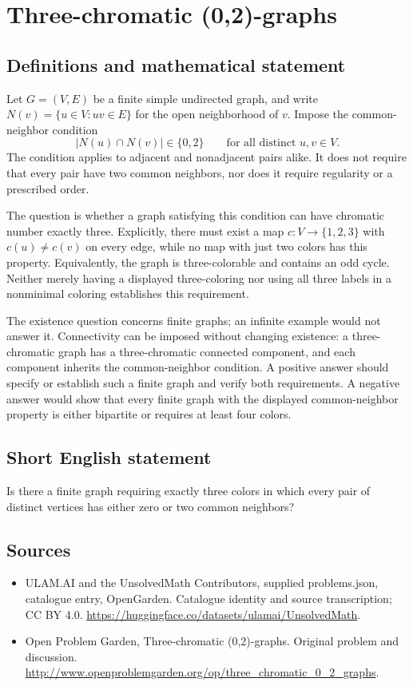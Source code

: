 \documentclass[11pt,a4paper]{article}
\begin{document}
\section*{Three-chromatic (0,2)-graphs}\label{statement}

\subsection{Definitions and mathematical statement}
Let $G=(V,E)$ be a finite simple undirected graph, and write $N(v)=\{u\in V:uv\in E\}$ for the open neighborhood of $v$. Impose the common-neighbor condition
\[
         |N(u)\cap N(v)|\in\{0,2\}
         \qquad\text{for all distinct }u,v\in V.
\]
The condition applies to adjacent and nonadjacent pairs alike. It does not require that every pair have two common neighbors, nor does it require regularity or a prescribed order.

The question is whether a graph satisfying this condition can have chromatic number exactly three. Explicitly, there must exist a map $c:V\to\{1,2,3\}$ with $c(u)\ne c(v)$ on every edge, while no map with just two colors has this property. Equivalently, the graph is three-colorable and contains an odd cycle. Neither merely having a displayed three-coloring nor using all three labels in a nonminimal coloring establishes this requirement.

The existence question concerns finite graphs; an infinite example would not answer it. Connectivity can be imposed without changing existence: a three-chromatic graph has a three-chromatic connected component, and each component inherits the common-neighbor condition. A positive answer should specify or establish such a finite graph and verify both requirements. A negative answer would show that every finite graph with the displayed common-neighbor property is either bipartite or requires at least four colors.
\subsection{Short English statement}
Is there a finite graph requiring exactly three colors in which every pair of distinct vertices has either zero or two common neighbors?
\subsection{Sources}
\begin{itemize}
\item[S1] ULAM.AI and the UnsolvedMath Contributors, supplied problems.json, catalogue entry, OpenGarden. Catalogue identity and source transcription; CC BY 4.0.
\url{https://huggingface.co/datasets/ulamai/UnsolvedMath}.
\item[S2] Open Problem Garden, Three-chromatic (0,2)-graphs. Original problem and discussion.
\url{http://www.openproblemgarden.org/op/three_chromatic_0_2_graphs}.
\end{itemize}
\end{document}
